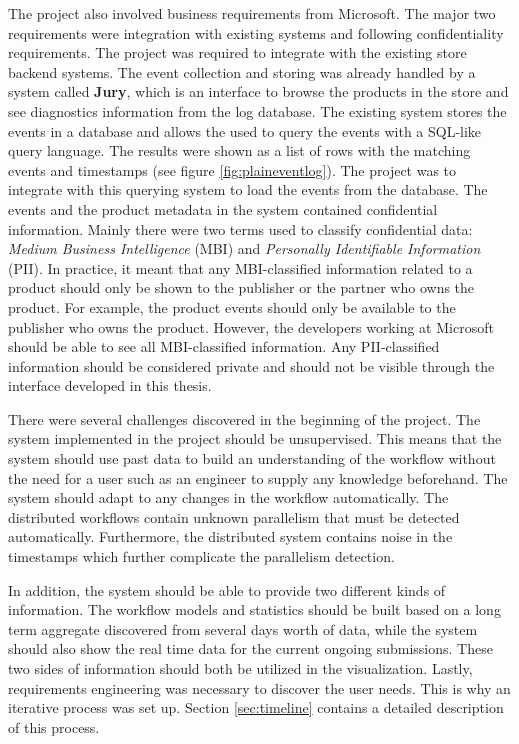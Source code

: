
The project also involved business requirements from Microsoft. 
The major two requirements were integration with existing systems and following confidentiality requirements.
The project was required to integrate with the existing store backend systems. 
The event collection and storing was already handled by a system called \textbf{Jury}, which is an interface to browse the products in the store and see diagnostics information from the log database.
The existing system stores the events in a database and allows the used to query the events with a SQL-like query language. 
The results were shown as a list of rows with the matching events and timestamps (see figure \ref{fig:plaineventlog}). 
The project was to integrate with this querying system to load the events from the database.
The events and the product metadata in the system contained confidential information. 
Mainly there were two terms used to classify confidential data: \textit{Medium Business Intelligence} (MBI) and \textit{Personally Identifiable Information} (PII). 
In practice, it meant that any MBI-classified information related to a product should only be shown to the publisher or the partner who owns the product.
For example, the product events should only be available to the publisher who owns the product.
However, the developers working at Microsoft should be able to see all MBI-classified information.
Any PII-classified information should be considered private and should not be visible through the interface developed in this thesis. 


There were several challenges discovered in the beginning of the project.
The system implemented in the project should be unsupervised.
This means that the system should use past data to build an understanding of the workflow without the need for a user such as an engineer to supply any knowledge beforehand.
The system should adapt to any changes in the workflow automatically.
The distributed workflows contain unknown parallelism that must be detected automatically.
Furthermore, the distributed system contains noise in the timestamps which further complicate the parallelism detection.

In addition, the system should be able to provide two different kinds of information. 
The workflow models and statistics should be built based on a long term aggregate discovered from several days worth of data,
while the system should also show the real time data for the current ongoing submissions.
These two sides of information should both be utilized in the visualization.
Lastly, requirements engineering was necessary to discover the user needs. 
This is why an iterative process was set up. 
Section \ref{sec:timeline} contains a detailed description of this process.

